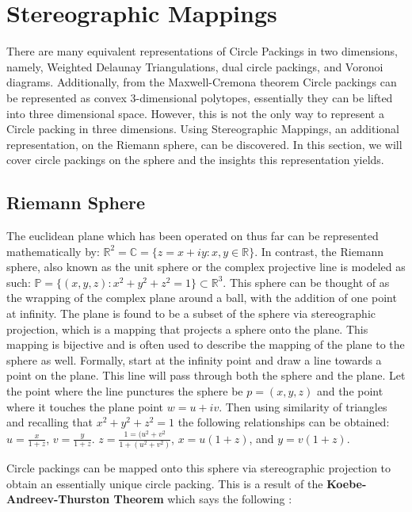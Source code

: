 \documentclass[11pt]{article}
\newcommand{\R}{\mathbb{R}}
\newcommand{\C}{\mathbb{C}}
\theoremstyle{definition}
\begin{document}
\section{Stereographic Mappings}

	There are many equivalent representations of Circle Packings in two dimensions, namely, Weighted Delaunay Triangulations, dual circle packings, and Voronoi diagrams. 
	Additionally, from the Maxwell-Cremona theorem Circle packings can be represented as convex 3-dimensional polytopes, essentially they can be lifted into three dimensional space. 
	However, this is not the only way to represent a Circle packing in three dimensions. 
	Using Stereographic Mappings, an additional representation, on the Riemann sphere, can be discovered. 
	In this section, we will cover circle packings on the sphere and the insights this representation yields.

\subsection{Riemann Sphere}
	The euclidean plane which has been operated on thus far can be represented mathematically by: $\R^2 = \C = \{z = x + iy : x, y \in \R \}$. 
	In contrast, the Riemann sphere, also known as the unit sphere or the complex projective line is modeled as such: $\mathbb{P} = \{(x,y,z):x^2 + y^2 + z^2 = 1\} \subset \R^3$. 
	This sphere can be thought of as the wrapping of the complex plane around a ball, with the addition of one point at infinity. 
	The plane is found to be a subset of the sphere via stereographic projection, which is a mapping that projects a sphere onto the plane. 
	This mapping is bijective and is often used to describe the mapping of the plane to the sphere as well. 
	Formally, start at the infinity point and draw a line towards a point on the plane. 
	This line will pass through both the sphere and the plane. 
	Let the point where the line punctures the sphere be $p = (x,y,z)$ and the point where it touches the plane point $w = u + iv$. 
	Then using similarity of triangles and recalling that $x^2 + y^2 + z^2 = 1$ the following relationships can be obtained: $u = \frac{x}{1 + z}$, $v = \frac{y}{1+ z}$. $z = \frac{1 = (u^2 + v^2}{1 + (u^2 + v^2)}$, $x = u(1+z)$, and $y =v(1+z)$.

	Circle packings can be mapped onto this sphere via stereographic projection to obtain an essentially unique circle packing. 
	This is a result of the \textbf{Koebe-Andreev-Thurston Theorem} which says the following \cite{stephenson05introduction}:
\end{document}
